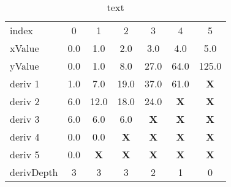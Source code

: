 \documentclass[main.tex]{subfiles}
\begin{document}
  
  \begin{table}[h]
    \centering
    \caption{text}
    \begin{tabularx}{0.65\linewidth}{ X | c c c c c c }
      index & 0 & 1 & 2 & 3 & 4 & 5 \\
      xValue & 0.0 & 1.0 & 2.0 & 3.0 & 4.0 & 5.0 \\
      \hline \hline
      yValue & 0.0 & 1.0 & 8.0 & 27.0 & 64.0 & 125.0 \\
      \hline
      deriv 1 & 1.0 & 7.0 & 19.0 & 37.0 & 61.0 & \textbf{X} \\
      deriv 2 & 6.0 & 12.0 & 18.0 & 24.0 & \textbf{X} & \textbf{X} \\
      deriv 3 & 6.0 & 6.0 & 6.0 & \textbf{X} & \textbf{X} & \textbf{X} \\
      deriv 4 & 0.0 & 0.0 & \textbf{X} & \textbf{X} & \textbf{X} & \textbf{X} \\
      deriv 5 & 0.0 & \textbf{X} & \textbf{X} & \textbf{X} & \textbf{X} & \textbf{X} \\
      \hline
      derivDepth & 3  & 3 & 3 & 2 & 1 & 0 \\
    \end{tabularx}
  \end{table}
  
\end{document}
